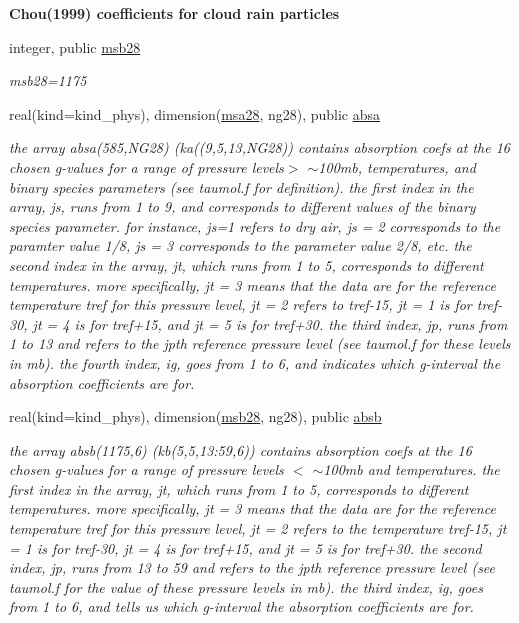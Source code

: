 \begin{Indent}\textbf{ Chou(1999) coefficients for cloud rain particles}\par
\begin{DoxyCompactItemize}
\item 
integer, public \hyperlink{group__module__radsw__kgbnn_ga55d73e39264b431135c6a9c809e20a94}{msb28}
\begin{DoxyCompactList}\small\item\em msb28=1175 \end{DoxyCompactList}\item 
real(kind=kind\+\_\+phys), dimension(\hyperlink{namespacemodule__radsw__kgb28_a32c6693eb82a3ed47ed13e07f526471a}{msa28}, ng28), public \hyperlink{group__module__radsw__kgbnn_ga5e48daf035b3b22b6e1b0f36aabcec10}{absa}
\begin{DoxyCompactList}\small\item\em the array absa(585,\+N\+G28) (ka((9,5,13,\+N\+G28)) contains absorption coefs at the 16 chosen g-\/values for a range of pressure levels$>$ $\sim$100mb, temperatures, and binary species parameters (see taumol.\+f for definition). the first index in the array, js, runs from 1 to 9, and corresponds to different values of the binary species parameter. for instance, js=1 refers to dry air, js = 2 corresponds to the paramter value 1/8, js = 3 corresponds to the parameter value 2/8, etc. the second index in the array, jt, which runs from 1 to 5, corresponds to different temperatures. more specifically, jt = 3 means that the data are for the reference temperature tref for this pressure level, jt = 2 refers to tref-\/15, jt = 1 is for tref-\/30, jt = 4 is for tref+15, and jt = 5 is for tref+30. the third index, jp, runs from 1 to 13 and refers to the jpth reference pressure level (see taumol.\+f for these levels in mb). the fourth index, ig, goes from 1 to 6, and indicates which g-\/interval the absorption coefficients are for. \end{DoxyCompactList}\item 
real(kind=kind\+\_\+phys), dimension(\hyperlink{group__module__radsw__kgbnn_ga55d73e39264b431135c6a9c809e20a94}{msb28}, ng28), public \hyperlink{group__module__radsw__kgbnn_gac3834ddd9d9e2106dc739094c800d09b}{absb}
\begin{DoxyCompactList}\small\item\em the array absb(1175,6) (kb(5,5,13\+:59,6)) contains absorption coefs at the 16 chosen g-\/values for a range of pressure levels $<$ $\sim$100mb and temperatures. the first index in the array, jt, which runs from 1 to 5, corresponds to different temperatures. more specifically, jt = 3 means that the data are for the reference temperature tref for this pressure level, jt = 2 refers to the temperature tref-\/15, jt = 1 is for tref-\/30, jt = 4 is for tref+15, and jt = 5 is for tref+30. the second index, jp, runs from 13 to 59 and refers to the jpth reference pressure level (see taumol.\+f for the value of these pressure levels in mb). the third index, ig, goes from 1 to 6, and tells us which g-\/interval the absorption coefficients are for. \end{DoxyCompactList}\item 

\end{DoxyCompactItemize}
\end{Indent}
